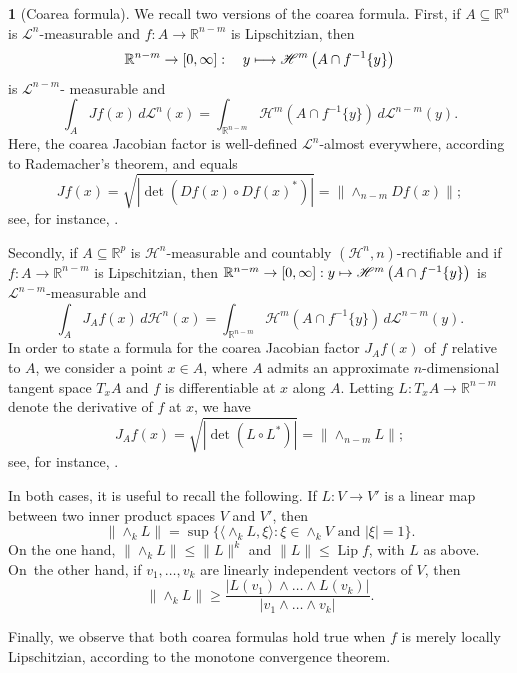 \documentclass[11pt]{article}
\newcounter{cdrthm}[section]
\theoremstyle{definition}
\theoremstyle{jepanonymous}
\newtheorem{jepempty}[cdrthm]{}
\newenvironment{enonce}[2][remark]{\begin{jepempty}[#2]}{\end{jepempty}}
\theoremstyle{plain}
\newcommand\mto{\mathchoice{\longmapsto}{\mapsto}{\mapsto}{\mapsto}}
\newenvironment{Empty}[2][\null]{%
\begin{enonce}[remark]{#1}#2}
{\end{enonce}}
\newcommand{\R}{\mathbb{R}}
\newcommand{\Rn}{\R^n}
\newcommand{\calH}{\mathscr{H}}
\newcommand{\calL}{\mathscr{L}}
\DeclareMathOperator{\rmLip}{\mathrm{Lip}}
\let\la\langle
\let\ra\rangle
\let\subset\subseteq
\begin{document}
\begin{Empty}[Coarea formula]
\label{coarea}
We recall two versions of the coarea formula.
First, if $A \subset \Rn$ is $\calL^n$-measurable and $f: A \to \R^{n-m}$ is Lipschitzian, then
\[
\R^{n-m} \to [0,\infty]:\quad y \mto \calH^m \left(A \cap f^{-1}\{y\} \right)
\]
is $\calL^{n-m}$- measurable and
\begin{equation*}
\int_A Jf(x) \,d\calL^n(x) = \int_{\R^{n-m}} \calH^m(A \cap f^{-1}\{y \}) \,d\calL^{n-m}(y).
\end{equation*}
Here, the coarea Jacobian factor is well-defined $\calL^n$-almost everywhere, according to Rademacher's theorem, and equals
\begin{equation*}
Jf(x) = \sqrt{ \left| \det \left(Df(x) \circ Df(x)^*\right)\right|} =\| {\wedge}_{n-m} Df(x)\| ;
\end{equation*}
see, for instance, \cite[Chap.\,3, \S 4]{EVANS.GARIEPY}.
\par
Secondly, if $A \subset \R^p$ is $\calH^n$-measurable and countably $(\calH^n,n)$-rectifiable and if $f: A \to \R^{n-m}$ is Lipschitzian, then $\R^{n-m} \to [0,\infty]: y \mto \calH^m \left(A \cap f^{-1}\{y\} \right)$ is $\calL^{n-m}$-measurable and
\begin{equation*}
\int_A J_Af(x) \,d\calH^n(x) = \int_{\R^{n-m}} \calH^m(A \cap f^{-1}\{y \}) \,d\calL^{n-m}(y).
\end{equation*}
In order to state a formula for the coarea Jacobian factor $J_Af(x)$ of $f$ relative to $A$, we consider a point $x \in A$, where $A$ admits an approximate $n$-dimensional tangent space $T_xA$ and $f$ is differentiable at $x$ along $A$.
Letting $L: T_x A \to \R^{n-m}$ denote the derivative of $f$ at $x$, we have
\begin{equation*}
J_Af(x) = \sqrt{ \left| \det \left(L \circ L^*\right)\right|} =\|{\wedge}_{n-m} L\| ;
\end{equation*}
see, for instance, \cite[3.2.22]{GMT}.
\par
In both cases, it is useful to recall the following.
If $L: V \to V'$ is a linear map between two inner product spaces $V$ and $V'$, then
\begin{equation}
\label{eq.11}
\|{\wedge}_k L \| = \sup\{ \la \wedge_k L, \xi \ra: \xi \in \wedge_k V \text{ and } |\xi| = 1\}.
\end{equation}
On the one hand, $\|{\wedge}_k L\| \leq \|L\|^k$ \cite[1.7.6]{GMT} and $\|L\| \leq \rmLip f$, with $L$ as above.
On~the other hand, if $v_1,\ldots,v_k$ are linearly independent vectors of $V$, then
\begin{equation}
\label{eq.12}
\|{\wedge}_k L \| \geq \frac{|L(v_1)\wedge \ldots \wedge L(v_k)|}{|v_1 \wedge \ldots \wedge v_k|}.
\end{equation}
\par
Finally, we observe that both coarea formulas hold true when $f$ is merely locally Lipschitzian, according to the monotone convergence theorem.
\end{Empty}
\end{document}
